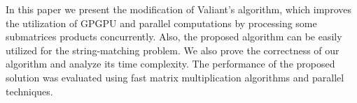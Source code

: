 In this paper we present the modification of Valiant's algorithm, which improves the utilization of GPGPU and parallel computations by processing some submatrices products concurrently.
Also, the proposed algorithm can be easily utilized for the string-matching problem.
We also prove the correctness of our algorithm and analyze its time complexity.
The performance of the proposed solution was evaluated using fast matrix multiplication algorithms and parallel techniques.
